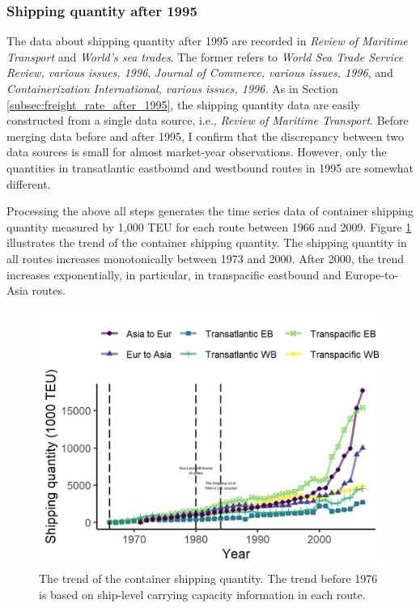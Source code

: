 \subsubsection{Shipping quantity after 1995}
The data about shipping quantity after 1995 are recorded in \textit{Review of Maritime Transport} and \textit{World's sea trades}. The former refers to \textit{World Sea Trade Service Review, various issues, 1996}, \textit{Journal of Commerce, various issues, 1996}, and \textit{Containerization International, various issues, 1996.} As in Section \ref{subsec:freight_rate_after_1995}, the shipping quantity data are easily constructed from a single data source, i.e., \textit{Review of Maritime Transport}. Before merging data before and after 1995, I confirm that the discrepancy between two data sources is small for almost market-year observations. However, only the quantities in transatlantic eastbound and westbound routes in 1995 are somewhat different.

Processing the above all steps generates the time series data of container shipping quantity measured by 1,000 TEU for each route between 1966 and 2009. Figure \ref{fg:container_shipping_quantity_each_route} illustrates the trend of the container shipping quantity. The shipping quantity in all routes increases monotonically between 1973 and 2000. After 2000, the trend increases exponentially, in particular, in transpacific eastbound and Europe-to-Asia routes.

\begin{figure}[!ht]
\begin{center}
\includegraphics[height = 0.5\textheight]{figuretable/container_shipping_quantity_each_route.png}

\end{center}
\caption{The trend of the container shipping quantity. The trend before 1976 is based on ship-level carrying capacity information in each route.}
\label{fg:container_shipping_quantity_each_route}
\end{figure}


